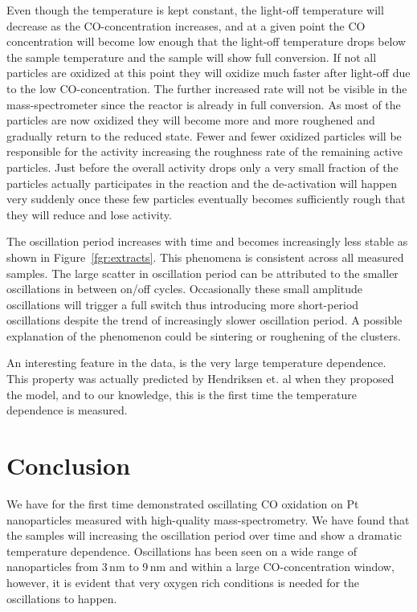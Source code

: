 \documentclass[8.5pt,twoside,twocolumn]{article}
\begin{document}
Even though the temperature is kept constant, the light-off temperature will decrease as the CO-concentration increases, and at a given point the CO concentration will become low enough that the light-off temperature drops below the sample temperature and the sample will show full conversion. If not all particles are oxidized at this point they will oxidize much faster after light-off due to the low CO-concentration. The further increased rate will not be visible in the mass-spectrometer since the reactor is already in full conversion. As most of the particles are now oxidized they will become more and more roughened and gradually return to the reduced state. Fewer and fewer oxidized particles will be responsible for the activity increasing the roughness rate of the remaining active particles. Just before the overall activity drops only a very small fraction of the particles actually participates in the reaction and the de-activation will happen very suddenly once these few particles eventually becomes sufficiently rough that they will reduce and lose activity.

The oscillation period increases with time and becomes increasingly less stable as shown in Figure~\ref{fgr:extracts}. This phenomena is consistent across all measured samples. The large scatter in oscillation period can be attributed to the smaller oscillations in between on/off cycles. Occasionally these small amplitude oscillations will trigger a full switch thus introducing more short-period oscillations despite the trend of increasingly slower oscillation period. A possible explanation of the phenomenon could be sintering or roughening of the clusters.

An interesting feature in the data, is the very large temperature dependence. This property was actually predicted by Hendriksen et. al \cite{Hendriksen2010} when they proposed the model, and to our knowledge, this is the first time the temperature dependence is measured.

\section{Conclusion}
We have for the first time demonstrated oscillating CO oxidation on Pt nanoparticles measured with high-quality mass-spectrometry. We have found that the samples will increasing the oscillation period over time and show a dramatic temperature dependence. Oscillations has been seen on a wide range of nanoparticles from 3\,nm to 9\,nm and within a large CO-concentration window, however, it is evident that very oxygen rich conditions is needed for the oscillations to happen.
\end{document}
